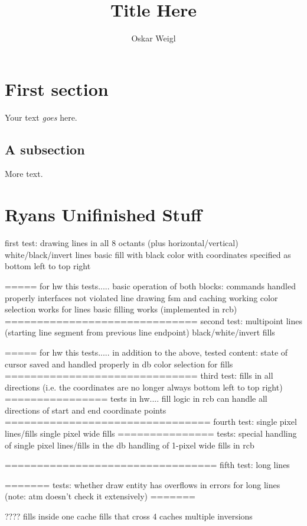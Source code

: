 \documentclass[]{article}
\title{Title Here}
\author{Oskar Weigl}
\begin{document}
\maketitle



\section{First section}

Your text \emph{goes} here.

\subsection{A subsection}

More text.

\section{Ryans Unifinished Stuff} %
\label{sec:ryans_unifinished_stuff}

first test:
drawing lines in all 8 octants (plus horizontal/vertical)
white/black/invert lines
basic fill with black color with coordinates specified as bottom left to top right

=====
for hw this tests.....
basic operation of both blocks:
 commands handled properly 
 interfaces not violated 
 line drawing fsm and caching working
 color selection works for lines
 basic filling works (implemented in rcb)
==============================
second test:
multipoint lines (starting line segment from previous line endpoint)
black/white/invert fills

=====
for hw this tests.....
in addition to the above, tested content:
 state of cursor saved and handled properly in db
 color selection for fills
==============================
third test:
fills in all directions (i.e. the coordinates are no longer always bottom left to top right)
================
tests in hw....
 fill logic in rcb can handle all directions of start and end coordinate points
================================
fourth test:
single pixel lines/fills
single pixel wide fills
===============
tests:
 special handling of single pixel lines/fills in the db
 handling of 1-pixel wide fills in rcb
 
=================================
fifth test: 
long lines

=======
tests:
 whether draw entity has overflows in errors for long lines (note: atm doesn't check it extensively)
=======


????
fills inside one cache
fills that cross 4 caches
multiple inversions

\end{document}
